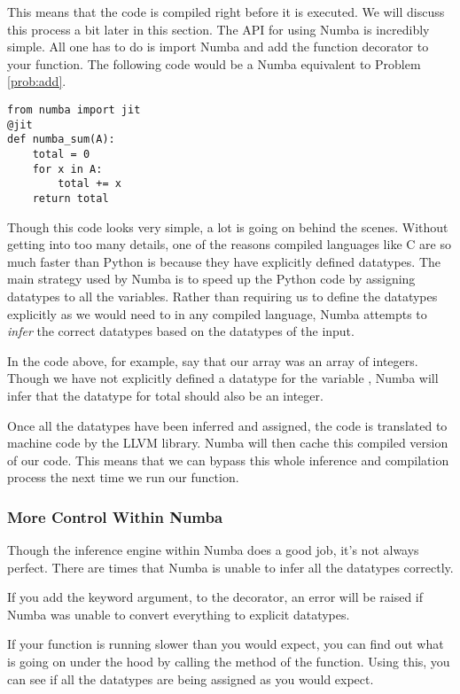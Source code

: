 This means that the code is compiled right before it is executed. We will discuss this process a bit later in this section.
The API for using Numba is incredibly simple. All one has to do is import Numba and add the  function decorator to your function. The following code would be a Numba equivalent to Problem \ref{prob:add}.
\begin{lstlisting}
from numba import jit
@jit
def numba_sum(A):
    total = 0
    for x in A:
        total += x
    return total
\end{lstlisting}

Though this code looks very simple, a lot is going on behind the scenes. Without getting into too many details, one of the reasons compiled languages like C are so much faster than Python is because they have explicitly defined datatypes. The main strategy used by Numba is to speed up the Python code by assigning datatypes to all the variables. Rather than requiring us to define the datatypes explicitly as we would need to in any compiled language, Numba attempts to \emph{infer} the correct datatypes based on the datatypes of the input.

In the code above, for example, say that our array  was an array of integers. Though we have not explicitly defined a datatype for the variable , Numba will infer that the datatype for total should also be an integer.

Once all the datatypes have been inferred and assigned, the code is translated to machine code by the LLVM library. Numba will then cache this compiled version of our code. This means that we can bypass this whole inference and compilation process the next time we run our function.

\subsubsection*{More Control Within Numba}
Though the inference engine within Numba does a good job, it's not always perfect. There are times that Numba is unable to infer all the datatypes correctly.

If you add the keyword argument,  to the  decorator, an error will be raised if Numba was unable to convert everything to explicit datatypes.

If your function is running slower than you would expect, you can find out what is going on under the hood by calling the  method of the function. Using this, you can see if all the datatypes are being assigned as you would expect.


